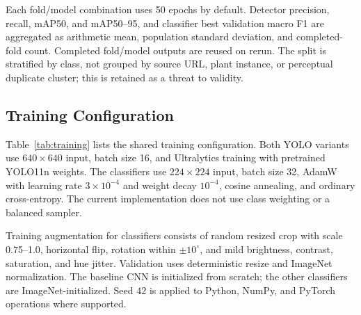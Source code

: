 \documentclass[conference]{IEEEtran}
\begin{document}
Each fold/model combination uses 50 epochs by default. Detector precision, recall, mAP50, and
mAP50--95, and classifier best validation macro F1 are aggregated as arithmetic mean, population
standard deviation, and completed-fold count. Completed fold/model outputs are reused on rerun.
The split is stratified by class, not grouped by source URL, plant instance, or perceptual duplicate
cluster; this is retained as a threat to validity.

\subsection{Training Configuration}

Table~\ref{tab:training} lists the shared training configuration. Both YOLO variants use
$640\times640$ input, batch size 16, and Ultralytics training with pretrained YOLO11n weights. The
classifiers use $224\times224$ input, batch size 32, AdamW with learning rate $3\times10^{-4}$ and
weight decay $10^{-4}$, cosine annealing, and ordinary cross-entropy. The current implementation
does not use class weighting or a balanced sampler.

Training augmentation for classifiers consists of random resized crop with scale 0.75--1.0,
horizontal flip, rotation within $\pm10^\circ$, and mild brightness, contrast, saturation, and hue
jitter. Validation uses deterministic resize and ImageNet normalization. The baseline CNN is
initialized from scratch; the other classifiers are ImageNet-initialized. Seed 42 is applied to
Python, NumPy, and PyTorch operations where supported.

\begin{table}[t]
\caption{Training configuration.}
\label{tab:training}
\centering
{}
\end{table}
\end{document}
